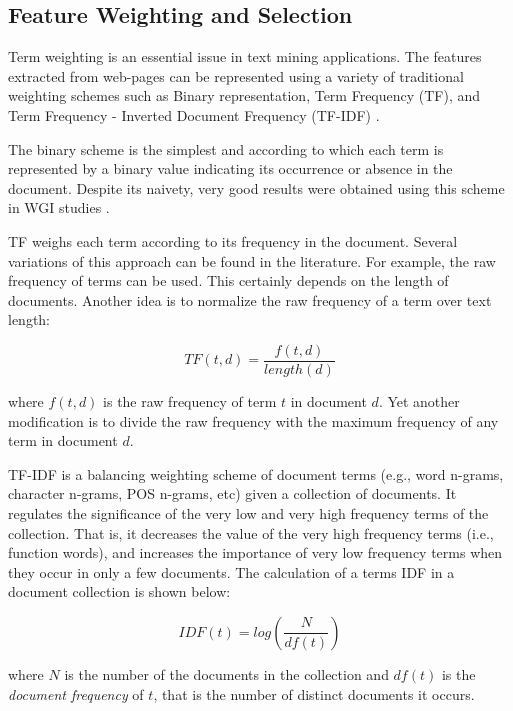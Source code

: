 \subsection{Feature Weighting and Selection}

Term weighting is an essential issue in text mining applications. The features extracted from web-pages can be represented using a variety of  traditional weighting schemes such as Binary representation, Term Frequency (TF), and Term Frequency - Inverted Document Frequency (TF-IDF) \parencite{sharoff2010web,santini2007automatic}. 

The binary scheme is the simplest and according to which each term is represented by a binary value indicating its occurrence or absence in the document. Despite its naivety, very good results were obtained using this scheme in WGI studies .

TF weighs each term according to its frequency in the document. Several variations of this approach can be found in the literature. For example, the raw frequency of terms can be used. This certainly depends on the length of documents. Another idea is to normalize the raw frequency of a term over text length:

\begin{equation}
    TF(t,d) = \frac{f(t,d)}{length(d)}
\end{equation}

\nointend where $f(t,d)$ is the raw frequency of term $t$ in document $d$. Yet another modification is to divide the raw frequency with the maximum frequency of any term in document $d$.

TF-IDF is a balancing weighting scheme of document terms (e.g., word n-grams, character n-grams, POS n-grams, etc) given a collection of documents. It regulates the significance of the very low and very high frequency terms of the collection. That is, it decreases the value of the very high frequency terms (i.e., function words), and increases the importance of very low frequency terms when they occur in only a few documents. The calculation of a terms IDF in a document collection is shown below:
 
\begin{equation}\label{chap:relevant_work:eq:idf}
 	IDF(t) = log \left( \frac{N}{df(t)} \right)
\end{equation}

\noindent
where $N$ is the number of the documents in the collection and $df(t)$ is the \textit{document frequency} of $t$, that is the number of distinct documents it occurs. 

